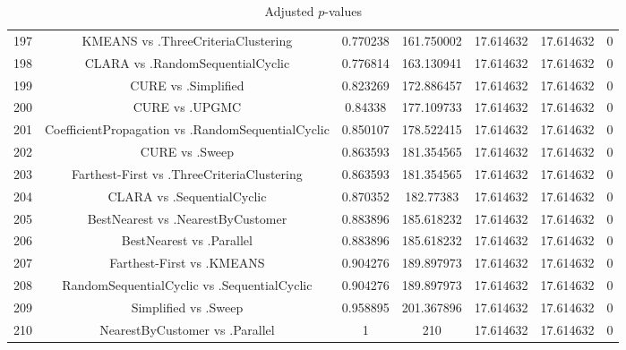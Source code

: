 \documentclass[a4paper,10pt]{article}
\begin{document}
\begin{landscape}
\begin{table}[!htp]
\begin{tabular}{ccccccc}
197&KMEANS vs .ThreeCriteriaClustering&0.770238&161.750002&17.614632&17.614632&0\\
198&CLARA vs .RandomSequentialCyclic&0.776814&163.130941&17.614632&17.614632&0\\
199&CURE vs .Simplified&0.823269&172.886457&17.614632&17.614632&0\\
200&CURE vs .UPGMC&0.84338&177.109733&17.614632&17.614632&0\\
201&CoefficientPropagation vs .RandomSequentialCyclic&0.850107&178.522415&17.614632&17.614632&0\\
202&CURE vs .Sweep&0.863593&181.354565&17.614632&17.614632&0\\
203&Farthest-First vs .ThreeCriteriaClustering&0.863593&181.354565&17.614632&17.614632&0\\
204&CLARA vs .SequentialCyclic&0.870352&182.77383&17.614632&17.614632&0\\
205&BestNearest vs .NearestByCustomer&0.883896&185.618232&17.614632&17.614632&0\\
206&BestNearest vs .Parallel&0.883896&185.618232&17.614632&17.614632&0\\
207&Farthest-First vs .KMEANS&0.904276&189.897973&17.614632&17.614632&0\\
208&RandomSequentialCyclic vs .SequentialCyclic&0.904276&189.897973&17.614632&17.614632&0\\
209&Simplified vs .Sweep&0.958895&201.367896&17.614632&17.614632&0\\
210&NearestByCustomer vs .Parallel&1&210&17.614632&17.614632&0\\
\hline
\end{tabular}
\caption{Adjusted $p$-values}
\end{table}

\end{landscape}
\end{document}
